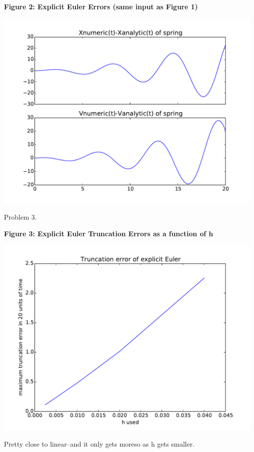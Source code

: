 \documentclass{article}
\begin{document}
\begin{center}
    \textbf{Figure 2: Explicit Euler Errors (same input as Figure 1)}\par\medskip
    \includegraphics[scale=1.0]{explicitEulerErrors1}
\end{center}


Problem 3.

\begin{center}
    \textbf{Figure 3: Explicit Euler Truncation Errors as a function of h}\par\medskip
    \includegraphics[scale=1.0]{eEtruncation}
\end{center}

Pretty close to linear--and it only gets moreso as h gets smaller.
\end{document}
